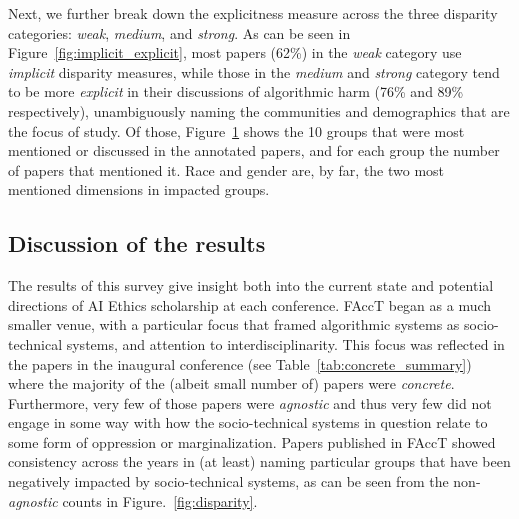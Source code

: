 \documentclass[manuscript]{acmart}
\begin{document}
\begin{figure}[htbp]
\begin{minipage}{.45\textwidth}
        \label{fig:groups}
    \end{minipage}%
\end{figure}

Next, we further break down the explicitness measure across the three disparity categories: %
\textit{weak}, \textit{medium}, and \textit{strong}. As can be seen in Figure~\ref{fig:implicit_explicit},  %
most papers (62\%) in the \textit{weak} category use \textit{implicit} disparity measures, while those in the \textit{medium} and \textit{strong} category tend to be more \textit{explicit} in their discussions of algorithmic harm (76\% and 89\% respectively), unambiguously naming the communities and demographics that are the focus of study. Of those, Figure~\ref{fig:groups} shows the 10 groups that were most mentioned or discussed in the annotated papers, and for each group the number of papers that mentioned it. Race and gender are, by far, the two most mentioned dimensions in impacted groups. 


\subsection{Discussion of the results}
\label{subsec:discussion}

The results of this survey give insight both into the current state and potential directions of AI Ethics scholarship at each conference.
FAccT began as a much smaller venue, with a particular %
focus that framed algorithmic systems as socio-technical systems, and attention to %
interdisciplinarity. %
This focus was reflected in the papers in the inaugural conference (see Table~\ref{tab:concrete_summary}) where the majority of the (albeit small number of) papers were \textit{concrete}. Furthermore, very few of those papers were \textit{agnostic} and thus very few did not engage in some way with how the socio-technical systems in question %
relate to some form of oppression or marginalization. Papers published in FAccT showed consistency across the years in (at least) naming particular groups that have been negatively impacted by socio-technical systems, as can be seen from the non-\textit{agnostic} counts in Figure.~\ref{fig:disparity}.
\end{document}
